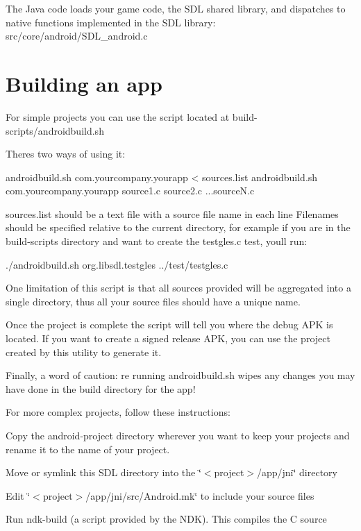 The Java code loads your game code, the S\+DL shared library, and dispatches to native functions implemented in the S\+DL library\+: src/core/android/\+S\+D\+L\+\_\+android.\+c



 \section*{Building an app }

For simple projects you can use the script located at build-\/scripts/androidbuild.\+sh

There\textquotesingle{}s two ways of using it\+: \begin{DoxyVerb}androidbuild.sh com.yourcompany.yourapp < sources.list
androidbuild.sh com.yourcompany.yourapp source1.c source2.c ...sourceN.c
\end{DoxyVerb}


sources.\+list should be a text file with a source file name in each line Filenames should be specified relative to the current directory, for example if you are in the build-\/scripts directory and want to create the testgles.\+c test, you\textquotesingle{}ll run\+: \begin{DoxyVerb}./androidbuild.sh org.libsdl.testgles ../test/testgles.c
\end{DoxyVerb}


One limitation of this script is that all sources provided will be aggregated into a single directory, thus all your source files should have a unique name.

Once the project is complete the script will tell you where the debug A\+PK is located. If you want to create a signed release A\+PK, you can use the project created by this utility to generate it.

Finally, a word of caution\+: re running androidbuild.\+sh wipes any changes you may have done in the build directory for the app!

For more complex projects, follow these instructions\+:


\begin{DoxyEnumerate}
\item Copy the android-\/project directory wherever you want to keep your projects and rename it to the name of your project.
\item Move or symlink this S\+DL directory into the \char`\"{}$<$project$>$/app/jni\char`\"{} directory
\item Edit \char`\"{}$<$project$>$/app/jni/src/\+Android.\+mk\char`\"{} to include your source files
\item Run \textquotesingle{}ndk-\/build\textquotesingle{} (a script provided by the N\+DK). This compiles the C source
\end{DoxyEnumerate}


